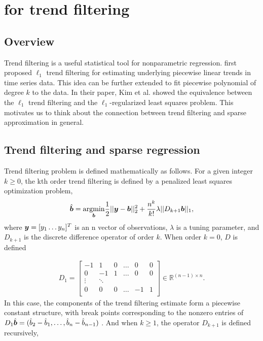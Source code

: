     \section{\susie for trend filtering}
\subsection{Overview}

  Trend filtering is a useful statistical tool for nonparametric regression. \cite{Kim07l1trend} first proposed $\ell_1$ trend filtering for estimating underlying piecewise linear trends in time series data. This idea can be further extended to fit piecewise polynomial of degree $k$ to the data. In their paper, Kim et al. showed the equivalence between the $\ell_1$ trend filtering and the $\ell_1$-regularized least squares problem. This motivates us to think about the connection between trend filtering and sparse approximation in general. 

\subsection{Trend filtering and sparse regression}
Trend filtering problem is defined mathematically as follows. For a given integer $k \geq 0$, the kth order trend filtering is defined by a penalized least squares optimization problem,
\begin{align}
\hat{\bm b} = \underset{\bm b}{\mathrm{argmin}} \frac{1}{2}|| \bm y- \bm b||_2^2 + \frac{n^k}{k!}\lambda||D_{k+1}\bm b||_1,
\end{align}
where $\bm y = [y_1 \dots y_n]^T$ is an n vector of observations, $\lambda$ is a tuning parameter, and $D_{k+1}$ is the discrete difference operator of order $k$. When order $k=0$, $D$ is defined 

\begin{align}\label{D1}
D_{1} = \begin{bmatrix} 
    -1 & 1 & 0 & \dots & 0 & 0\\
    0 & -1 & 1 & \dots & 0 & 0\\
    \vdots & \ddots & \\
    0 & 0 & 0 & \dots & -1 & 1\\
    \end{bmatrix}
    \in \mathbb{R}^{(n-1)\times n}.
\end{align}
In this case, the components of the trend filtering estimate form a piecewise constant structure, with break points corresponding to the nonzero entries of $D_{1}\hat{\bm b} = (\hat{b}_2 - \hat{b}_1, \dots, \hat{b}_n - \hat{b}_{n-1})$ \cite{Tibshirani2014}. And when $k\geq 1$, the operator $D_{k+1}$ is defined recursively,


